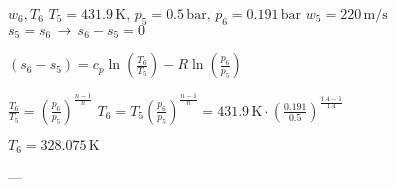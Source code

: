 \( w_6, T_6 \)  
\( T_5 = 431.9 \, \text{K}, \, p_5 = 0.5 \, \text{bar}, \, p_6 = 0.191 \, \text{bar} \)  
\( w_5 = 220 \, \text{m/s} \)  
\( s_5 = s_6 \, \rightarrow \, s_6 - s_5 = 0 \)  

\( \left( s_6 - s_5 \right) = c_p \ln \left( \frac{T_6}{T_5} \right) - R \ln \left( \frac{p_6}{p_5} \right) \)  

\( \frac{T_6}{T_5} = \left( \frac{p_6}{p_5} \right)^{\frac{n-1}{n}} \)  
\( T_6 = T_5 \left( \frac{p_6}{p_5} \right)^{\frac{n-1}{n}} = 431.9 \, \text{K} \cdot \left( \frac{0.191}{0.5} \right)^{\frac{1.4-1}{1.4}} \)  

\( T_6 = 328.075 \, \text{K} \)  

---